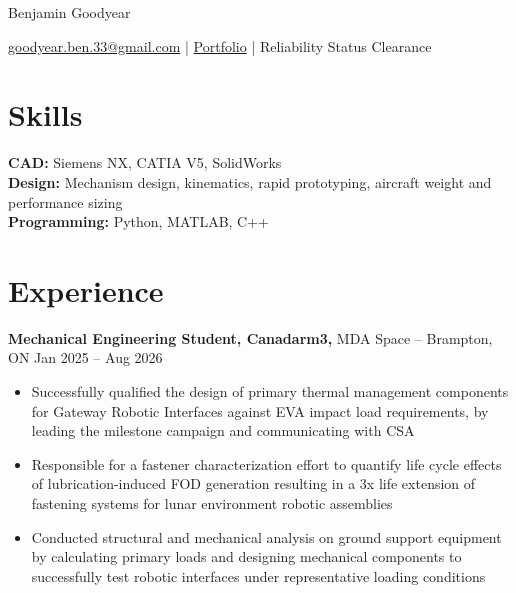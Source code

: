 \documentclass[11pt]{article}       %
\newcommand{\ph}[1]{{\color{red}[#1]}}
\begin{document}
 
\centerline{\Huge Benjamin Goodyear}
 
\vspace{5pt}
 
\centerline{\href{mailto:goodyear.ben.33@gmail.com}{goodyear.ben.33@gmail.com} | \href{https://goodyear33.github.io/}{Portfolio} | Reliability Status Clearance}
 
\vspace{-10pt}
 
\section*{Skills}
\textbf{CAD:} Siemens NX, CATIA V5, SolidWorks \\
\textbf{Design:} Mechanism design, kinematics, rapid prototyping, aircraft weight and performance sizing \\
\textbf{Programming:} Python, MATLAB, C++ 
 
\vspace{-6.5pt}
 
\section*{Experience}
\textbf{Mechanical Engineering Student, Canadarm3,} MDA Space -- Brampton, ON \hfill Jan 2025 -- Aug 2026 \\
\vspace{-9pt}
\begin{itemize}
  \item Successfully qualified the design of primary thermal management components for Gateway Robotic Interfaces against EVA impact load requirements, by leading the milestone campaign and communicating with CSA
  \item Responsible for a fastener characterization effort to quantify life cycle effects of lubrication-induced FOD generation resulting in a 3x life extension of fastening systems for lunar environment robotic assemblies
  \item Conducted structural and mechanical analysis on ground support equipment by calculating primary loads and designing mechanical components to successfully test robotic interfaces under representative loading conditions 
\end{itemize}
 
\end{document}
